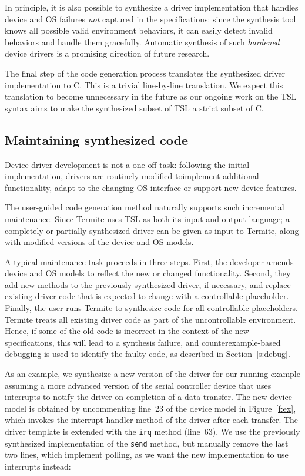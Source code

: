 \documentclass{book}
\newcommand{\termite}{Termite\xspace}
\newcommand{\tsl}{TSL\xspace}
\theoremstyle{definition}
\newcommand{\src}[1]{\texttt{\small #1}}
\begin{document}
In principle, it is also possible to synthesize a driver implementation that handles device and OS failures \emph{not} captured in the specifications: since the synthesis tool knows all possible valid environment behaviors, it can easily detect invalid behaviors and handle them gracefully.  Automatic synthesis of such \emph{hardened} device drivers is a promising direction of future research.

The final step of the code generation process translates the synthesized driver implementation to C.  This is a trivial line-by-line translation.  We expect this translation to become unnecessary in the future as our ongoing work on the \tsl syntax aims to make the synthesized subset of \tsl a strict subset of C.

\subsection{Maintaining synthesized code~~} 
Device driver development is not a one-off task: following the initial implementation, drivers are routinely modified toimplement additional functionality, adapt to the changing OS interface or support new device features.

The user-guided code generation method naturally supports such incremental maintenance. Since \termite uses \tsl as both its input and output language;  a completely or partially synthesized driver can be given as input to \termite, along with modified versions of the device and OS models.

A typical maintenance task proceeds in three steps.  First, the developer amends device and OS models to reflect the new or changed functionality.  Second, they add new methods to the previously synthesized driver, if necessary, and replace existing driver code that is expected to change with a controllable  placeholder.  Finally, the user runs \termite to synthesize code for all controllable placeholders.  \termite treats all existing driver code as part of the uncontrollable environment.  Hence, if some of the old code is incorrect in the context of the new specifications, this will lead to a synthesis failure, and counterexample-based debugging is used to identify the faulty code, as described in Section~\ref{s:debug}.

As an example, we synthesize a new version of the driver for our running example assuming a more advanced version of the serial controller device that uses interrupts to notify the driver on completion of a data transfer.  The new device model is obtained by uncommenting line~23 of the device model in Figure~\ref{f:ex}, which invokes the interrupt handler method of the driver after each transfer.  The driver template is extended with the \src{irq} method (line~63).  We use the previously synthesized implementation of the \src{send} method, but manually remove the last two lines, which implement polling, as we want the new implementation to use interrupts instead:
\end{document}
